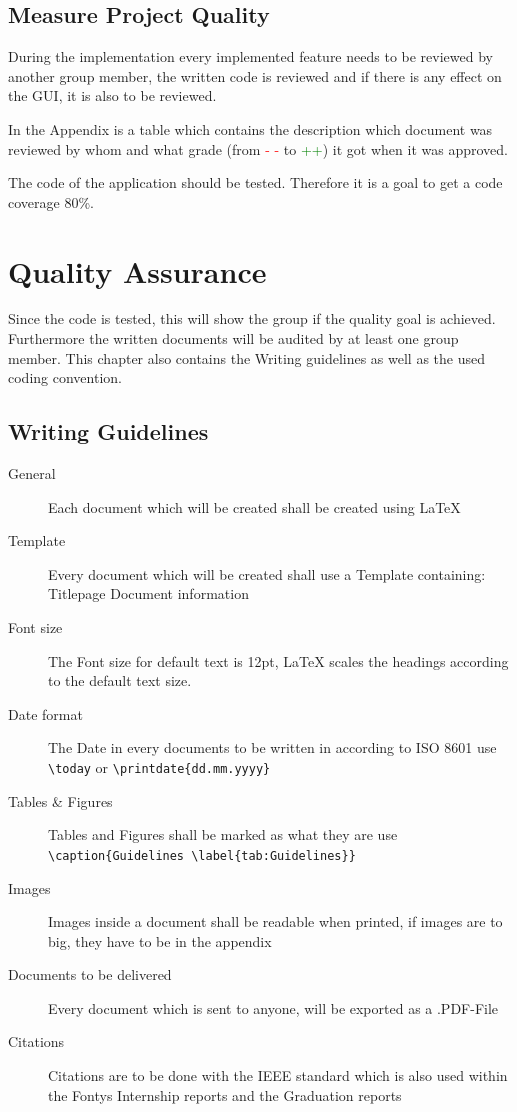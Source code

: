 \documentclass[12pt]{article}
\begin{document}
\subsection{Measure Project Quality}
During the implementation every implemented feature needs to be reviewed by another group member, the written code is reviewed and if there is any effect on the GUI, it is also to be reviewed. 

In the Appendix is a table which contains the description which document was reviewed by whom and what grade (from \textcolor{red}{- -} to \textcolor{green}{++}) it got when it was approved.

The code of the application should be tested. Therefore it is a goal to get a code coverage 80\%.
\clearpage
\section{Quality Assurance}
Since the code is tested, this will show the group if the quality goal is achieved. Furthermore the written documents will be audited by at least one group member. This chapter also contains the Writing guidelines as well as the used coding convention.
\subsection{Writing Guidelines}
\begin{description}
	\item[General] Each document which will be created shall be created using LaTeX
	\item[Template] Every document which will be created shall use a Template containing:
	\subitem Titlepage
	\subitem Document information
	\item[Font size] The Font size for default text is 12pt, LaTeX scales the headings according to the default text size.
	\item[Date format] The Date in every documents to be written in according to ISO 8601
	\subitem use \verb|\today| or \verb|\printdate{dd.mm.yyyy}|
	\item[Tables \& Figures] Tables and Figures shall be marked as what they are
	\subitem use \verb|\caption{Guidelines \label{tab:Guidelines}}|
	\item[Images] Images inside a document shall be readable when printed, if images are to big, they have to be in the appendix
	\item[Documents to be delivered] Every document which is sent to anyone, will be exported as a .PDF-File
	\item[Citations] Citations are to be done with the IEEE standard which is also used within the Fontys Internship reports and the Graduation reports
	
\end{description}
\end{document}
